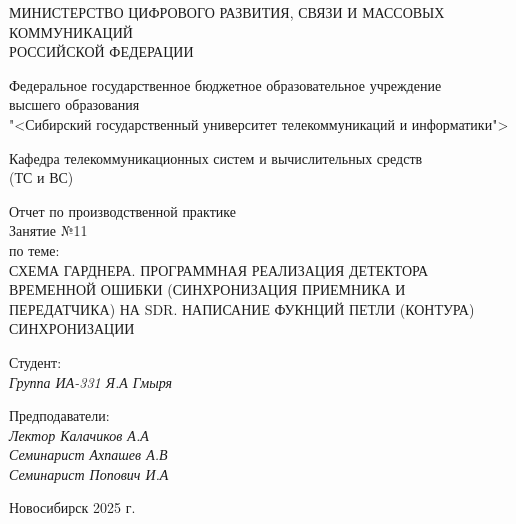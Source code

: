 \thispagestyle{empty}

\begin{center}
    МИНИСТЕРСТВО ЦИФРОВОГО РАЗВИТИЯ, СВЯЗИ И МАССОВЫХ КОММУНИКАЦИЙ \\ РОССИЙСКОЙ ФЕДЕРАЦИИ

    \vspace{20pt}

    Федеральное государственное бюджетное образовательное учреждение  \\  высшего образования \\
    "<Сибирский государственный университет телекоммуникаций и информатики"> \\

    \vspace{20pt}

    Кафедра телекоммуникационных систем и вычислительных средств \\  (ТС и ВС)
\end{center}

\vfill

\begin{center}
    Отчет по производственной практике \\  
    Занятие №11 \\

    \vspace{20pt}
    по теме: \\
    \uppercase{Схема Гарднера. Программная реализация детектора временной ошибки (синхронизация приемника и передатчика) на SDR. 
    Написание фукнций петли (контура) синхронизации}
\end{center}

\vfill

    \noindent Студент: \\
    \textit{Группа ИА-331 \hfill Я.А Гмыря}

    \vspace{20pt}

    \noindent Предподаватели: \\
    \textit{Лектор \hfill Калачиков А.А} \\
    \textit{Семинарист \hfill Ахпашев А.В} \\
    \textit{Семинарист \hfill Попович И.А}

\vfill

\begin{center}
    Новосибирск 2025 г.
\end{center}